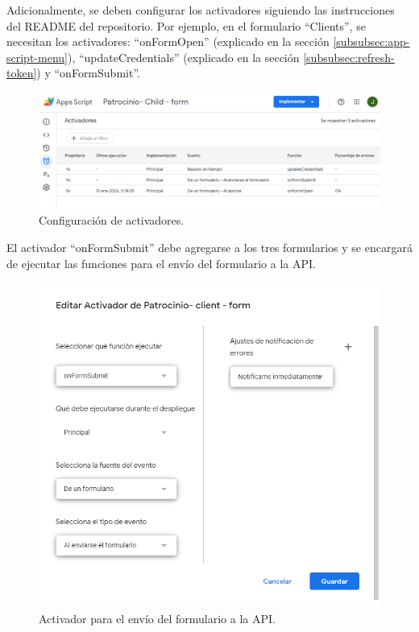 Adicionalmente, se deben configurar los activadores siguiendo las instrucciones del README del repositorio. Por ejemplo, en el formulario ``Clients'', se necesitan los activadores: ``onFormOpen'' (explicado en la sección \ref{subsubsec:app-script-menu}), ``updateCredentials'' (explicado en la sección \ref{subsubsec:refresh-token}) y ``onFormSubmit''.

\begin{figure}[H]
\centering
\includegraphics[width=0.90\linewidth]{fig/activadores.png}
\caption{Configuración de activadores.}
\label{fig:activadores}
\end{figure}

El activador ``onFormSubmit'' debe agregarse a los tres formularios y se encargará de ejecutar las funciones para el envío del formulario a la API.

\begin{figure}[H]
\centering
\includegraphics[width=0.75\linewidth]{fig/activador-api-send-form.png}
\caption{Activador para el envío del formulario a la API.}
\label{fig:activador-api-send-form}
\end{figure}





